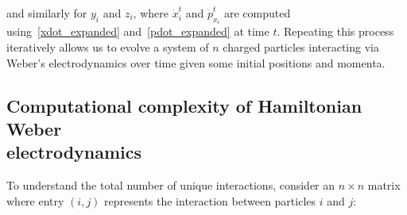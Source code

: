 \documentclass[12pt,a4paper]{article}
\theoremstyle{definition}
\theoremstyle{remark}
\begin{document}
and similarly for $y_i$ and $z_i$, where $\dot{x}_i^t$ and $\dot{p}_{x_i}^t$ are computed using~\eqref{xdot_expanded} and~\eqref{pdot_expanded} at time $t$. Repeating this process iteratively allows us to evolve a system of $n$ charged particles interacting via Weber's electrodynamics over time given some initial positions and momenta.

\subsection[Computational complexity of Hamiltonian Weber electrodynamics]{Computational complexity of Hamiltonian Weber \\ electrodynamics}\label{complexity}
To understand the total number of unique interactions, consider an $n \times n$ matrix where entry $(i,j)$ represents the interaction between particles $i$ and $j$:

\begin{center}
\end{center}
\end{document}
